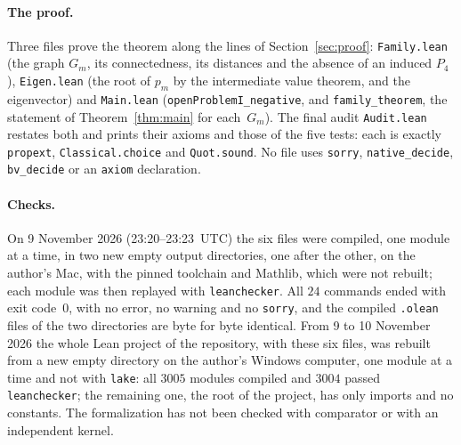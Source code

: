 \documentclass[11pt]{article}
\theoremstyle{remark}
\begin{document}
\paragraph{The proof.}
Three files prove the theorem along the lines of Section~\ref{sec:proof}:
\texttt{Family.lean} (the graph $G_m$, its connectedness, its distances and the
absence of an induced $P_4$), \texttt{Eigen.lean} (the root of $p_m$ by the
intermediate value theorem, and the eigenvector) and \texttt{Main.lean}
(\texttt{openProblemI\_negative}, and \texttt{family\_theorem}, the statement of
Theorem~\ref{thm:main} for each~$G_m$). The final audit
\texttt{Audit.lean} restates both and prints their axioms and those of the
five tests: each is exactly \texttt{propext}, \texttt{Classical.choice} and
\texttt{Quot.sound}. No file uses \texttt{sorry}, \texttt{native\_decide},
\texttt{bv\_decide} or an \texttt{axiom} declaration.

\paragraph{Checks.}
On 9 November 2026 (23:20--23:23~UTC) the six files were compiled, one module at
a time, in two new empty output directories, one after the other, on the
author's Mac, with the pinned toolchain and Mathlib, which were not rebuilt;
each module was then replayed with \texttt{leanchecker}. All $24$ commands
ended with exit code~$0$, with no error, no warning and no \texttt{sorry}, and
the compiled \texttt{.olean} files of the two directories are byte for byte
identical. From 9 to 10 November 2026 the whole Lean project of the
repository, with these six files, was rebuilt from a new empty directory on the
author's Windows computer, one module at a time and not with \texttt{lake}: all
$3005$ modules compiled and $3004$ passed \texttt{leanchecker}; the remaining
one, the root of the project, has only imports and no constants. The formalization has not been checked with comparator or with
an independent kernel.
\end{document}
